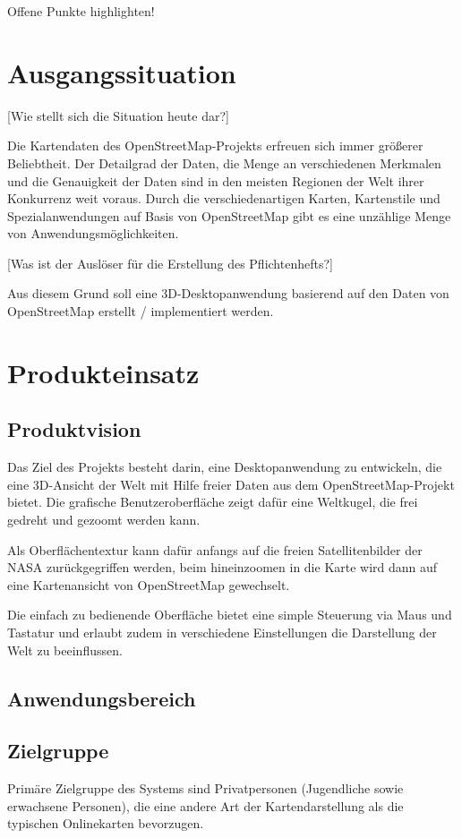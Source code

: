 \documentclass[10pt]{report}
\begin{document}
Offene Punkte highlighten!

\chapter{Ausgangssituation}
[Wie stellt sich die Situation heute dar?]

Die Kartendaten des OpenStreetMap-Projekts erfreuen sich immer größerer Beliebtheit. Der Detailgrad der Daten, die Menge an verschiedenen Merkmalen und die Genauigkeit der Daten sind in den meisten Regionen der Welt ihrer Konkurrenz weit voraus. Durch die verschiedenartigen Karten, Kartenstile und Spezialanwendungen auf Basis von OpenStreetMap gibt es eine unzählige Menge von Anwendungsmöglichkeiten.


[Was ist der Auslöser für die Erstellung des Pflichtenhefts?]

Aus diesem Grund soll eine 3D-Desktopanwendung basierend auf den Daten von OpenStreetMap erstellt / implementiert werden.


\chapter{Produkteinsatz}
\section{Produktvision}

Das Ziel des Projekts besteht darin, eine Desktopanwendung zu entwickeln, die eine 3D-Ansicht der Welt mit Hilfe freier Daten aus dem OpenStreetMap-Projekt bietet. Die grafische Benutzeroberﬂäche zeigt dafür eine Weltkugel, die frei gedreht und gezoomt werden kann. 

Als Oberﬂächentextur kann dafür anfangs auf die freien Satellitenbilder der
NASA zurückgegriﬀen werden, beim hineinzoomen in die Karte wird dann auf eine Kartenansicht von OpenStreetMap gewechselt.

Die einfach zu bedienende Oberﬂäche bietet eine simple Steuerung via Maus und Tastatur und erlaubt zudem in verschiedene Einstellungen die Darstellung der Welt zu beeinﬂussen. 


\section{Anwendungsbereich}



\section{Zielgruppe}
Primäre Zielgruppe des Systems sind Privatpersonen (Jugendliche sowie erwachsene Personen), die eine andere Art der Kartendarstellung als die typischen Onlinekarten bevorzugen.
\end{document}
